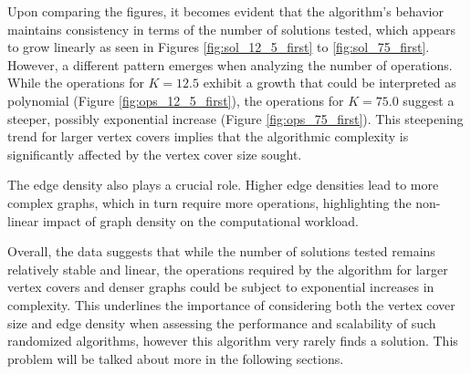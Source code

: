 Upon comparing the figures, it becomes evident that the algorithm's behavior maintains consistency in terms of the number of solutions tested, which appears to grow linearly as seen in Figures \ref{fig:sol_12_5_first} to \ref{fig:sol_75_first}. However, a different pattern emerges when analyzing the number of operations. While the operations for \( K=12.5 \) exhibit a growth that could be interpreted as polynomial (Figure \ref{fig:ops_12_5_first}), the operations for \( K=75.0 \) suggest a steeper, possibly exponential increase (Figure \ref{fig:ops_75_first}). This steepening trend for larger vertex covers implies that the algorithmic complexity is significantly affected by the vertex cover size sought.

The edge density also plays a crucial role. Higher edge densities lead to more complex graphs, which in turn require more operations, highlighting the non-linear impact of graph density on the computational workload.

Overall, the data suggests that while the number of solutions tested remains relatively stable and linear, the operations required by the algorithm for larger vertex covers and denser graphs could be subject to exponential increases in complexity. This underlines the importance of considering both the vertex cover size and edge density when assessing the performance and scalability of such randomized algorithms, however this algorithm very rarely finds a solution. This problem will be talked about more in the following sections.
